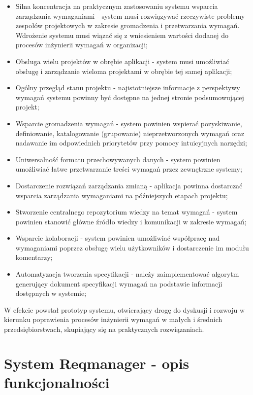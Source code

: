     \begin{itemize}
      \item Silna koncentracja na praktycznym zastosowaniu systemu wsparcia zarządzania wymaganiami - system musi rozwiązywać rzeczywiste problemy zespołów projektowych w zakresie gromadzenia i przetwarzania wymagań. Wdrożenie systemu musi wiązać się z wniesieniem wartości dodanej do procesów inżynierii wymagań w organizacji;
      \item Obsługa wielu projektów w obrębie aplikacji - system musi umożliwiać obsługę i zarządzanie wieloma projektami w obrębie tej samej aplikacji;
      \item Ogólny przegląd stanu projektu - najistotniejsze informacje z perspektywy wymagań systemu powinny być dostępne na jednej stronie podsumowującej projekt;
      \item Wsparcie gromadzenia wymagań - system powinien wspierać pozyskiwanie, definiowanie, katalogowanie (grupowanie) nieprzetworzonych wymagań oraz nadawanie im odpowiednich priorytetów przy pomocy intuicyjnych narzędzi;
      \item Uniwersalność formatu przechowywanych danych - system powinien umożliwiać łatwe przetwarzanie treści wymagań przez zewnętrzne systemy;
      \item Dostarczenie rozwiązań zarządzania zmianą - aplikacja powinna dostarczać wsparcia zarządzania wymaganiami na późniejszych etapach projektu;
      \item Stworzenie centralnego repozytorium wiedzy na temat wymagań - system powinien stanowić główne źródło wiedzy i komunikacji w zakresie wymagań;
      \item Wsparcie kolaboracji - system powinien umożliwiać współpracę nad wymaganiami poprzez obsługę wielu użytkowników i dostarczenie im modułu komentarzy;
      \item Automatyzacja tworzenia specyfikacji - należy zaimplementować algorytm generujący dokument specyfikacji wymagań na podstawie informacji dostępnych w systemie;
    \end{itemize}

    W efekcie powstał prototyp systemu, otwierający drogę do dyskusji i rozwoju w kierunku poprawienia procesów inżynierii wymagań w małych i średnich przedsiębiorstwach, skupiający się na praktycznych rozwiązaniach. 

  \section{System Reqmanager - opis funkcjonalności}

